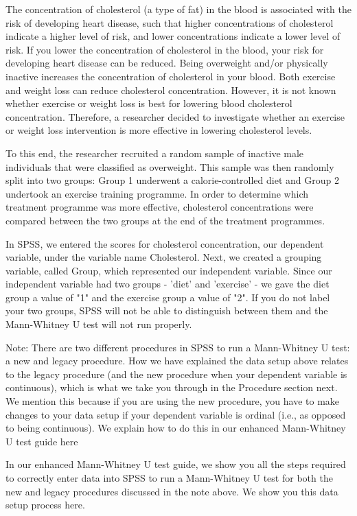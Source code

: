 \documentclass[]{article}
\begin{document}
The concentration of cholesterol (a type of fat) in the blood is associated with the risk of developing heart disease, such that higher concentrations of cholesterol indicate a higher level of risk, and lower concentrations indicate a lower level of risk. If you lower the concentration of cholesterol in the blood, your risk for developing heart disease can be reduced. Being overweight and/or physically inactive increases the concentration of cholesterol in your blood. Both exercise and weight loss can reduce cholesterol concentration. However, it is not known whether exercise or weight loss is best for lowering blood cholesterol concentration. Therefore, a researcher decided to investigate whether an exercise or weight loss intervention is more effective in lowering cholesterol levels. 

To this end, the researcher recruited a random sample of inactive male individuals that were classified as overweight. This sample was then randomly split into two groups: Group 1 underwent a calorie-controlled diet and Group 2 undertook an exercise training programme. In order to determine which treatment programme was more effective, cholesterol concentrations were compared between the two groups at the end of the treatment programmes.


In SPSS, we entered the scores for cholesterol concentration, our dependent variable, under the variable name Cholesterol. Next, we created a grouping variable, called Group, which represented our independent variable. Since our independent variable had two groups - 'diet' and 'exercise' - we gave the diet group a value of "1" and the exercise group a value of "2". If you do not label your two groups, SPSS will not be able to distinguish between them and the Mann-Whitney U test will not run properly.

Note: There are two different procedures in SPSS to run a Mann-Whitney U test: a new and legacy procedure. How we have explained the data setup above relates to the legacy procedure (and the new procedure when your dependent variable is continuous), which is what we take you through in the Procedure section next. We mention this because if you are using the new procedure, you have to make changes to your data setup if your dependent variable is ordinal (i.e., as opposed to being continuous). We explain how to do this in our enhanced Mann-Whitney U test guide here

In our enhanced Mann-Whitney U test guide, we show you all the steps required to correctly enter data into SPSS to run a Mann-Whitney U test for both the new and legacy procedures discussed in the note above. We show you this data setup process here.
\end{document}
